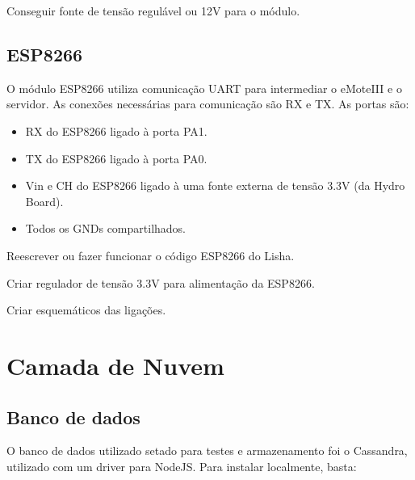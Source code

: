 \documentclass[11pt]{article}
\begin{document}
\begin{todobox}
\begin{todolist}
\item Conseguir fonte de tensão regulável ou 12V para o módulo.
\end{todolist}
\end{todobox}

\subsection{ESP8266}

O módulo ESP8266 utiliza comunicação UART para intermediar o eMoteIII e o servidor. As conexões necessárias para comunicação são RX e TX. As portas são:

\begin{itemize}
\item RX do ESP8266 ligado à porta PA1.
\item TX do ESP8266 ligado à porta PA0.
\item Vin e CH do ESP8266 ligado à uma fonte externa de tensão 3.3V (da Hydro Board).
\item Todos os GNDs compartilhados.
\end{itemize}

\begin{todobox}
\begin{todolist}
\item[\done] Reescrever ou fazer funcionar o código ESP8266 do Lisha.
\item[\done] Criar regulador de tensão 3.3V para alimentação da ESP8266.
\item[\done] Criar esquemáticos das ligações.
\end{todolist}
\end{todobox}

\section{Camada de Nuvem}

\subsection{Banco de dados}

O banco de dados utilizado setado para testes e armazenamento foi o Cassandra, utilizado com um driver para NodeJS. Para instalar localmente, basta:


\end{document}
